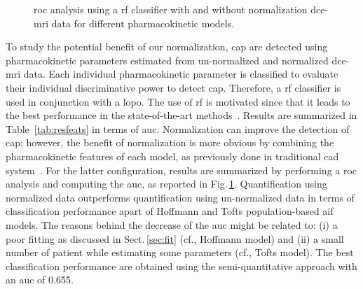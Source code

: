 \begin{figure}
  \centering
  \hspace*{\fill}
   \hfill
  \hspace*{\fill}
  \caption{\acs*{roc} analysis using a \acs*{rf} classifier with and without normalization \ac{dce}-\ac{mri} data for different pharmacokinetic models.}
  \label{fig:normpharmarf}
\end{figure}

To study the potential benefit of our normalization, \ac{cap} are detected using pharmacokinetic parameters estimated from un-normalized and normalized \ac{dce}-\ac{mri} data.
Each individual pharmacokinetic parameter is classified to evaluate their individual discriminative power to detect \ac{cap}.
Therefore, a \ac{rf} classifier is used in conjunction with a \ac{lopo}.
The use of \ac{rf} is motivated since that it leads to the best performance in the state-of-the-art methods~\citep{litjens2014computer,lemaitre2015computer}.
Results are summarized in Table~\ref{tab:resfeats} in terms of \ac{auc}.
Normalization can improve the detection of \ac{cap}; however, the benefit of normalization is more obvious by combining the pharmacokinetic features of each model, as previously done in traditional \ac{cad} system~\citep{lemaitre2015computer}.
For the latter configuration, results are summarized by performing a \ac{roc} analysis and computing the \ac{auc}, as reported in Fig.\,\ref{fig:normpharmarf}.
Quantification using normalized data outperforms quantification using un-normalized data in terms of classification performance apart of Hoffmann and Tofts population-based \ac{aif} models.
The reasons behind the decrease of the \ac{auc} might be related to: (i) a poor fitting as discussed in Sect.\,\ref{sec:fit} (cf., Hoffmann model) and (ii) a small number of patient while estimating some parameters (cf., Tofts model).
The best classification performance are obtained using the semi-quantitative approach with an \ac{auc} of 0.655.

